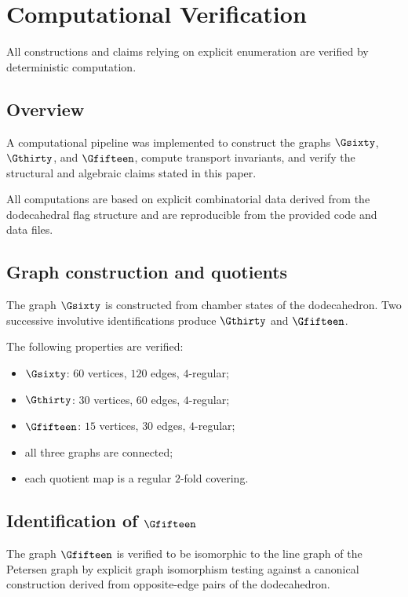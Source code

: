 \section{Computational Verification}

All constructions and claims relying on explicit enumeration are
verified by deterministic computation.

\subsection{Overview}

A computational pipeline was implemented to construct the graphs
$\Gsixty$, $\Gthirty$, and $\Gfifteen$, compute transport invariants,
and verify the structural and algebraic claims stated in this paper.

All computations are based on explicit combinatorial data derived from
the dodecahedral flag structure and are reproducible from the provided
code and data files.

\subsection{Graph construction and quotients}

The graph $\Gsixty$ is constructed from chamber states of the
dodecahedron. Two successive involutive identifications produce
$\Gthirty$ and $\Gfifteen$.

The following properties are verified:
\begin{itemize}
\item $\Gsixty$: $60$ vertices, $120$ edges, $4$-regular;
\item $\Gthirty$: $30$ vertices, $60$ edges, $4$-regular;
\item $\Gfifteen$: $15$ vertices, $30$ edges, $4$-regular;
\item all three graphs are connected;
\item each quotient map is a regular $2$-fold covering.
\end{itemize}

\subsection{Identification of $\Gfifteen$}

The graph $\Gfifteen$ is verified to be isomorphic to the line graph of
the Petersen graph by explicit graph isomorphism testing against a
canonical construction derived from opposite-edge pairs of the
dodecahedron.

